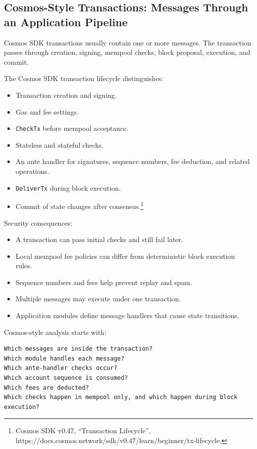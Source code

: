 \subsection{Cosmos-Style Transactions: Messages Through an Application
Pipeline}

Cosmos SDK transactions usually contain one or more messages. The
transaction passes through creation, signing, mempool checks, block
proposal, execution, and commit.

The Cosmos SDK transaction lifecycle distinguishes:

\begin{itemize}
\tightlist
\item
  Transaction creation and signing.
\item
  Gas and fee settings.
\item
  \passthrough{\lstinline!CheckTx!} before mempool acceptance.
\item
  Stateless and stateful checks.
\item
  An ante handler for signatures, sequence numbers, fee deduction, and
  related operations.
\item
  \passthrough{\lstinline!DeliverTx!} during block execution.
\item
  Commit of state changes after consensus.\footnote{Cosmos SDK v0.47,
    ``Transaction Lifecycle'',
    https://docs.cosmos.network/sdk/v0.47/learn/beginner/tx-lifecycle.}
\end{itemize}

Security consequences:

\begin{itemize}
\tightlist
\item
  A transaction can pass initial checks and still fail later.
\item
  Local mempool fee policies can differ from deterministic block
  execution rules.
\item
  Sequence numbers and fees help prevent replay and spam.
\item
  Multiple messages may execute under one transaction.
\item
  Application modules define message handlers that cause state
  transitions.
\end{itemize}

Cosmos-style analysis starts with:

\begin{lstlisting}
Which messages are inside the transaction?
Which module handles each message?
Which ante-handler checks occur?
Which account sequence is consumed?
Which fees are deducted?
Which checks happen in mempool only, and which happen during block execution?
\end{lstlisting}

